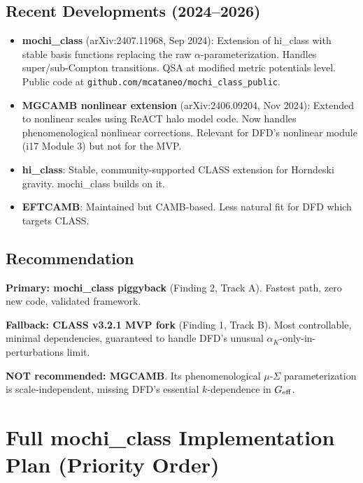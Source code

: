 \documentclass[11pt]{article}
\theoremstyle{definition}
\theoremstyle{remark}
\newcommand{\Geff}{G_{\rm eff}}
\begin{document}
\subsection{Recent Developments (2024--2026)}

\begin{itemize}
\item \textbf{mochi\_class} (arXiv:2407.11968, Sep 2024): Extension
  of hi\_class with stable basis functions replacing the raw
  $\alpha$-parameterization. Handles super/sub-Compton transitions.
  QSA at modified metric potentials level. Public code at
  \texttt{github.com/mcataneo/mochi\_class\_public}.

\item \textbf{MGCAMB nonlinear extension} (arXiv:2406.09204, Nov 2024):
  Extended to nonlinear scales using ReACT halo model code. Now
  handles phenomenological nonlinear corrections. Relevant for DFD's
  nonlinear module (i17 Module 3) but not for the MVP.

\item \textbf{hi\_class}: Stable, community-supported CLASS extension
  for Horndeski gravity. mochi\_class builds on it.

\item \textbf{EFTCAMB}: Maintained but CAMB-based. Less natural fit
  for DFD which targets CLASS.
\end{itemize}

\subsection{Recommendation}

\textbf{Primary: mochi\_class piggyback} (Finding 2, Track A).
Fastest path, zero new code, validated framework.

\textbf{Fallback: CLASS v3.2.1 MVP fork} (Finding 1, Track B).
Most controllable, minimal dependencies, guaranteed to handle
DFD's unusual $\alpha_K$-only-in-perturbations limit.

\textbf{NOT recommended: MGCAMB}. Its phenomenological $\mu$-$\Sigma$
parameterization is scale-independent, missing DFD's essential
$k$-dependence in $\Geff$.

\section{Full mochi\_class Implementation Plan (Priority Order)}
\label{sec:fullplan}
\end{document}
